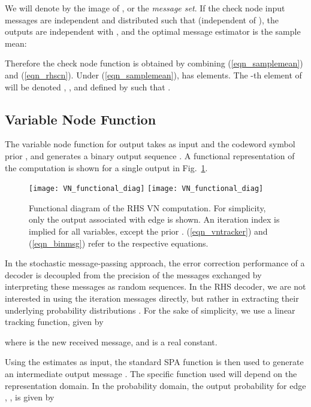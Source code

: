 \documentclass[12pt,journal,twoside,draftcls,onecolumn]{IEEEtran}
\begin{document}
We will denote by  the image of , or the \emph{message set}. If the check node input messages  are independent and distributed such that  (independent of ), the outputs  are independent with , and the optimal message estimator  is the sample mean:

Therefore the check node function is obtained by combining (\ref{eqn_samplemean}) and (\ref{eqn_rhscn}).
Under (\ref{eqn_samplemean}),  has  elements. The -th element of  will be denoted , , and defined by  such that .


\subsection{Variable Node Function}

	The variable node function for output  takes as input  and the codeword symbol prior , and generates a binary output sequence . A functional representation of the computation is shown for a single output in Fig.~\ref{fig_vnfunct}.
	

	\begin{figure}[tbp]
	\begin{center}
\ifCLASSOPTIONdraftcls
	\texttt{[image: VN\_functional\_diag]}
\else
	\texttt{[image: VN\_functional\_diag]}
\fi
	\caption{Functional diagram of the RHS VN computation. For simplicity, only the output associated with edge  is shown. An iteration index  is implied for all variables, except the prior . (\ref{eqn_vntracker}) and (\ref{eqn_binmsg}) refer to the respective equations.}
	\label{fig_vnfunct}
	\end{center}
	\end{figure}

	
	In the stochastic message-passing approach, the error correction performance of a decoder is decoupled from the precision of the messages exchanged by interpreting these messages as random sequences.
	In the RHS decoder, we are not interested in using the iteration messages  directly, but rather in extracting their underlying probability distributions .
	For the sake of simplicity, we use a linear tracking function, given by
	
	where  is the new received message, and  is a real constant.
	
	Using the estimates  as input, the standard SPA function is then used to generate an intermediate output message . The specific function used will depend on the representation domain. In the probability domain, the output probability for edge , , is given by
	
\end{document}
